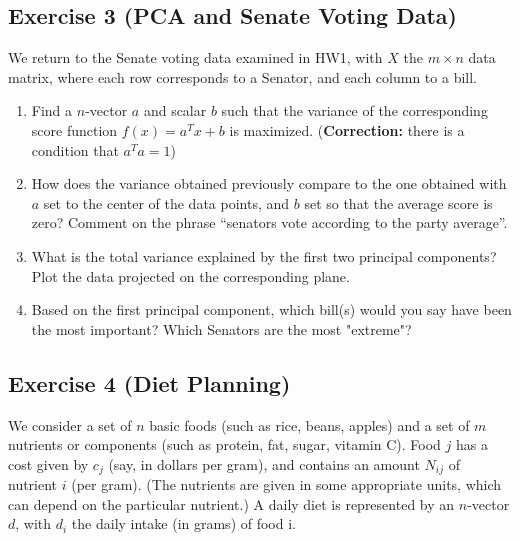 \documentclass[11pt]{article}
\begin{document}
\begin{solution}
\end{solution}


\newpage
\subsection*{Exercise 3 (PCA and Senate Voting Data)}

We return to the Senate voting data examined in HW1, with $X$ the $m \times n$ data matrix, where each row corresponds to a Senator, and each column to a bill.
\begin{enumerate}
    \item Find a $n$-vector $a$ and scalar $b$ such that the variance of the corresponding score function $f(x) = a^Tx+b$ is maximized. (\textbf{Correction:} there is a condition that $a^T a = 1$)
    \item How does the variance obtained previously compare to the one obtained with $a$ set to the center of the data points, and $b$ set so that the average score is zero? Comment on the phrase ``senators vote according to the party average''.
    \item What is the total variance explained by the first two principal components? Plot the data projected on the corresponding plane.
    \item Based on the first principal component, which bill(s) would you say have been the most important? Which Senators are the most "extreme"?
\end{enumerate}

\begin{solution}
\end{solution}

\newpage
\subsection*{Exercise 4 (Diet Planning)}

We consider a set of $n$ basic foods (such as rice, beans, apples) and a set of $m$ nutrients or components (such as protein, fat, sugar, vitamin C). Food $j$ has a cost given by $c_j$ (say, in dollars per gram), and contains an amount $N_{ij}$ of nutrient $i$ (per gram). (The nutrients are given in some appropriate units, which can depend on the particular nutrient.) A daily diet is represented by an $n$-vector $d$, with $d_i$ the daily intake (in grams) of food i.
\end{document}
